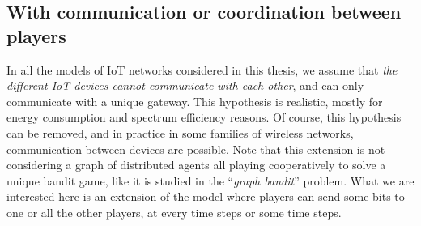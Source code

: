 




\subsection{With communication or coordination between players}
\label{sub:5:withCommunicationOrCoordination}

In all the models of IoT networks considered in this thesis, we assume that \emph{the different IoT devices cannot communicate with each other}, and can only communicate with a unique gateway.
This hypothesis is realistic, mostly for energy consumption and spectrum efficiency reasons.
Of course, this hypothesis can be removed, and in practice in some families of wireless networks, communication between devices are possible.
Note that this extension is not considering a graph of distributed agents all playing cooperatively to solve a unique bandit game, like it is studied in the ``\emph{graph bandit}'' problem.
What we are interested here is an extension of the model where players can send some bits to one or all the other players, at every time steps or some time steps.

